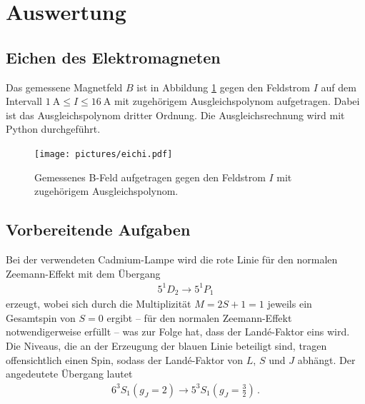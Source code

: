 \section{Auswertung}
\label{sec:Auswertung}
%
\subsection{Eichen des Elektromagneten}%
Das gemessene Magnetfeld $B$ ist in Abbildung \ref{fig:eichi} gegen den Feldstrom $I$ auf dem
Intervall $\SI{1}{\ampere} \le I \le \SI{16}{\ampere}$ mit zugehörigem Ausgleichspolynom
aufgetragen. Dabei ist das Ausgleichspolynom dritter Ordnung.
Die Ausgleichsrechnung wird mit Python \cite{scipy} durchgeführt.
\begin{figure}
	\centering
	\texttt{[image: pictures/eichi.pdf]}
	\caption{Gemessenes B-Feld aufgetragen gegen den Feldstrom $I$ mit zugehörigem Ausgleichspolynom.}
	\label{fig:eichi}
\end{figure}

\subsection{Vorbereitende Aufgaben}
	\label{sec:vorb}
	Bei der verwendeten Cadmium-Lampe wird die rote Linie für den normalen Zeemann-Effekt
	mit dem Übergang
	\begin{align*}
		5^1D_2 \rightarrow 5^1P_1
	\end{align*}
	erzeugt, wobei sich durch die Multiplizität $M=2S+1=1$ jeweils ein Gesamtspin von
	$S=0$ ergibt -- für den normalen Zeemann-Effekt notwendigerweise erfüllt --
	was zur Folge hat, dass der Landé-Faktor eins wird.
	Die Niveaus, die an der Erzeugung der blauen Linie beteiligt sind, tragen offensichtlich
	einen Spin, sodass der Landé-Faktor von $L$, $S$ und $J$ abhängt. Der angedeutete
	Übergang lautet
	\begin{align*}
		6^3S_1 (g_J=2) \rightarrow 5^3S_1 (g_J=\frac{3}{2}) \, \mathrm{.}
	\end{align*}

